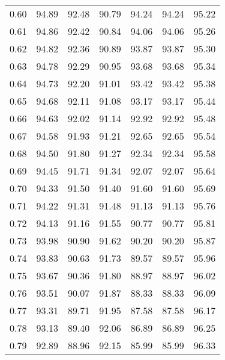 \begin{tabular}{|c|c|c|c|c|c|c|}
      0.60 &     94.89 &     92.48 &      90.79 &   94.24 &      94.24 &         95.22 \\
      0.61 &     94.86 &     92.42 &      90.84 &   94.06 &      94.06 &         95.26 \\
      0.62 &     94.82 &     92.36 &      90.89 &   93.87 &      93.87 &         95.30 \\
      0.63 &     94.78 &     92.29 &      90.95 &   93.68 &      93.68 &         95.34 \\
      0.64 &     94.73 &     92.20 &      91.01 &   93.42 &      93.42 &         95.38 \\
      0.65 &     94.68 &     92.11 &      91.08 &   93.17 &      93.17 &         95.44 \\
      0.66 &     94.63 &     92.02 &      91.14 &   92.92 &      92.92 &         95.48 \\
      0.67 &     94.58 &     91.93 &      91.21 &   92.65 &      92.65 &         95.54 \\
      0.68 &     94.50 &     91.80 &      91.27 &   92.34 &      92.34 &         95.58 \\
      0.69 &     94.45 &     91.71 &      91.34 &   92.07 &      92.07 &         95.64 \\
      0.70 &     94.33 &     91.50 &      91.40 &   91.60 &      91.60 &         95.69 \\
      0.71 &     94.22 &     91.31 &      91.48 &   91.13 &      91.13 &         95.76 \\
      0.72 &     94.13 &     91.16 &      91.55 &   90.77 &      90.77 &         95.81 \\
      0.73 &     93.98 &     90.90 &      91.62 &   90.20 &      90.20 &         95.87 \\
      0.74 &     93.83 &     90.63 &      91.73 &   89.57 &      89.57 &         95.96 \\
      0.75 &     93.67 &     90.36 &      91.80 &   88.97 &      88.97 &         96.02 \\
      0.76 &     93.51 &     90.07 &      91.87 &   88.33 &      88.33 &         96.09 \\
      0.77 &     93.31 &     89.71 &      91.95 &   87.58 &      87.58 &         96.17 \\
      0.78 &     93.13 &     89.40 &      92.06 &   86.89 &      86.89 &         96.25 \\
      0.79 &     92.89 &     88.96 &      92.15 &   85.99 &      85.99 &         96.33 \\

\end{tabular}
